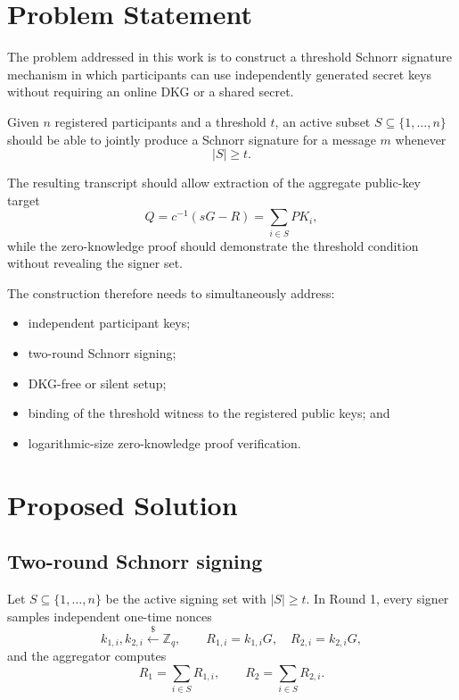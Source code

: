 \documentclass[10pt,a4paper]{article}
\newcommand{\Zq}{\mathbb{Z}_q}
\begin{document}
\section{Problem Statement}

The problem addressed in this work is to construct a threshold Schnorr
signature mechanism in which participants can use independently generated
secret keys without requiring an online DKG or a shared secret.

Given $n$ registered participants and a threshold $t$, an active subset
$S\subseteq\{1,\ldots,n\}$ should be able to jointly produce a Schnorr
signature for a message $m$ whenever
\[
|S|\geq t.
\]

The resulting transcript should allow extraction of the aggregate public-key
target
\[
Q=c^{-1}(sG-R)=\sum_{i\in S}PK_i,
\]
while the zero-knowledge proof should demonstrate the threshold condition
without revealing the signer set.

The construction therefore needs to simultaneously address:
\begin{itemize}
\item independent participant keys;
\item two-round Schnorr signing;
\item DKG-free or silent setup;
\item binding of the threshold witness to the registered public keys; and
\item logarithmic-size zero-knowledge proof verification.
\end{itemize}

\section{Proposed Solution}

\subsection{Two-round Schnorr signing}

Let $S\subseteq\{1,\ldots,n\}$ be the active signing set with $|S|\ge t$.
In Round 1, every signer samples independent one-time nonces
\[
k_{1,i},k_{2,i}\xleftarrow{\$}\Zq,
\qquad
R_{1,i}=k_{1,i}G,\quad R_{2,i}=k_{2,i}G,
\]
and the aggregator computes
\[
R_1=\sum_{i\in S}R_{1,i},\qquad
R_2=\sum_{i\in S}R_{2,i}.
\]
\end{document}
